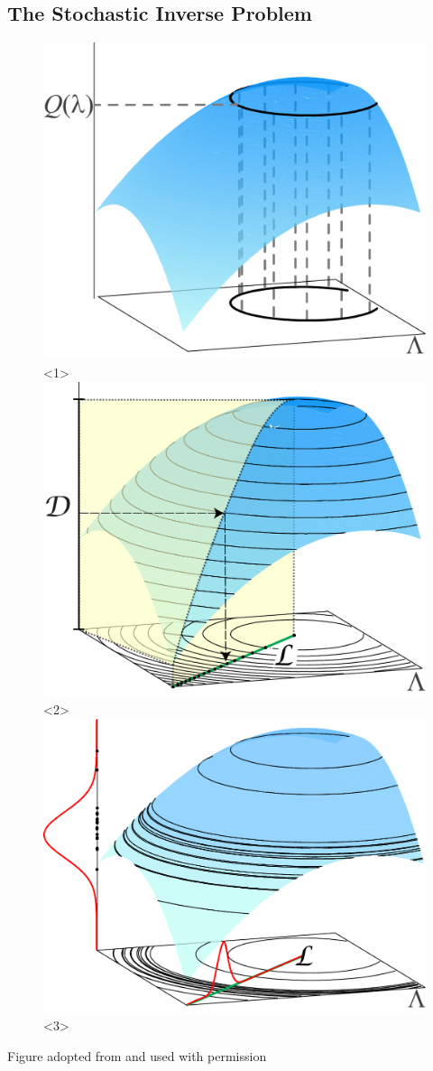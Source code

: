\subsection{The Stochastic Inverse Problem}
\begin{frame}[t]

\begin{figure}
\centering
	\includegraphics[width=.65\textwidth]{images/illustration1}<1>
	\includegraphics[width=.65\textwidth]{images/illustration2}<2>
	\includegraphics[width=.7\textwidth]{images/illustration3}<3>
\end{figure}
\begin{center}
{\scriptsize Figure adopted from \cite{BET14+} and used with permission}
\end{center}
\end{frame}

